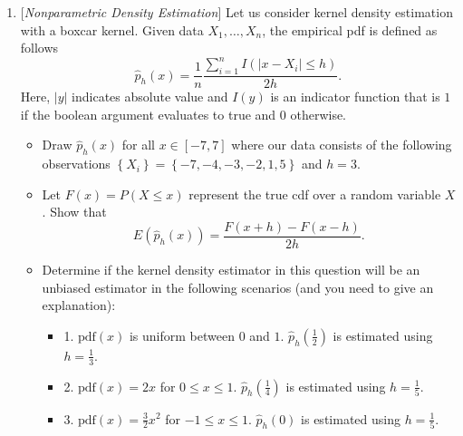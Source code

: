 \documentclass[10pt]{article}
\begin{document}
\begin{enumerate}
\newpage





\item {} {[}\textit{Nonparametric Density Estimation}{]}
Let us consider kernel density estimation with a boxcar kernel. Given
data $X_{1},\dots,X_{n}$, the empirical pdf is defined as follows
\[
\hat{p}_{h}\left(x\right)=\frac{1}{n}\frac{\sum_{i=1}^{n}I\left(\left|x-X_{i}\right|\leq h\right)}{2h}.
\]
Here, $\left|y\right|$ indicates absolute value and $I\left(y\right)$
is an indicator function that is $1$ if the boolean argument evaluates
to true and $0$ otherwise.
\begin{itemize}
\item[(a)]  Draw $\hat{p}_{h}\left(x\right)$ for all $x\in\left[-7,7\right]$
where our data consists of the following observations $\left\{ X_{i}\right\} =\left\{ -7,-4,-3,-2,1,5\right\} $
and $h=3$. 
\item[(b)]  Let $F\left(x\right)=P\left(X\leq x\right)$ represent the true
cdf over a random variable $X$. Show that
\[
E\left(\hat{p}_{h}\left(x\right)\right)=\frac{F\left(x+h\right)-F\left(x-h\right)}{2h}.
\]
\item[(c)]  Determine if the kernel density estimator in this question will
be an unbiased estimator in the following scenarios (and you need
to give an explanation):
\begin{itemize}
\item 1. $\text{pdf}\left(x\right)$ is uniform between $0$ and $1$. $\hat{p}_{h}\left(\frac{1}{2}\right)$
is estimated using $h=\frac{1}{3}$.
\item 2. $\text{pdf}\left(x\right)=2x$ for $0\leq x\leq1$. $\hat{p}_{h}\left(\frac{1}{4}\right)$
is estimated using $h=\frac{1}{5}$.
\item 3. $\text{pdf}\left(x\right)=\frac{3}{2}x^{2}$ for $-1\leq x\leq1$.
$\hat{p}_{h}\left(0\right)$ is estimated using $h=\frac{1}{5}$.
\end{itemize}
\end{itemize}








\newpage


\end{enumerate}
\end{document}
